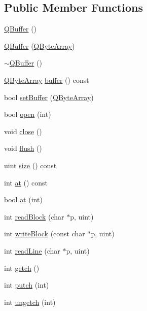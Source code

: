 \subsection*{Public Member Functions}
\begin{DoxyCompactItemize}
\item 
\mbox{\hyperlink{class_q_buffer_a89e6eb0af3076429fcaf14755f856d9a}{Q\+Buffer}} ()
\item 
\mbox{\hyperlink{class_q_buffer_ac88f81ed56581532b835e83812a8650a}{Q\+Buffer}} (\mbox{\hyperlink{class_q_array}{Q\+Byte\+Array}})
\item 
\mbox{\hyperlink{class_q_buffer_a23e9bc1bae06f2c96e456d6b5ca1b52d}{$\sim$\+Q\+Buffer}} ()
\item 
\mbox{\hyperlink{class_q_array}{Q\+Byte\+Array}} \mbox{\hyperlink{class_q_buffer_a4f369e95bc73a6141f1616824ea79470}{buffer}} () const
\item 
bool \mbox{\hyperlink{class_q_buffer_ad4c608788c2730ca60295488f75da423}{set\+Buffer}} (\mbox{\hyperlink{class_q_array}{Q\+Byte\+Array}})
\item 
bool \mbox{\hyperlink{class_q_buffer_aa3ceff2217a13a570e0dcec157b23b18}{open}} (int)
\item 
void \mbox{\hyperlink{class_q_buffer_affd0b382476516b0d4e3adfaf27c0247}{close}} ()
\item 
void \mbox{\hyperlink{class_q_buffer_a5e16941f9973d0263ea1ef79b54bc88f}{flush}} ()
\item 
uint \mbox{\hyperlink{class_q_buffer_aa064f4e430cdd1babd400982881012a8}{size}} () const
\item 
int \mbox{\hyperlink{class_q_buffer_adbff1cb0375ac6bc27621d26450c6c0a}{at}} () const
\item 
bool \mbox{\hyperlink{class_q_buffer_a4b4cd4e092b55db973fa34f76403b65d}{at}} (int)
\item 
int \mbox{\hyperlink{class_q_buffer_a7deacf4bbd599f075f3dad4b20cafeb0}{read\+Block}} (char $\ast$p, uint)
\item 
int \mbox{\hyperlink{class_q_buffer_ad8bdac07e525a782d0759d3082bb296a}{write\+Block}} (const char $\ast$p, uint)
\item 
int \mbox{\hyperlink{class_q_buffer_adcbf115b0d36683e6da2d3baa367382d}{read\+Line}} (char $\ast$p, uint)
\item 
int \mbox{\hyperlink{class_q_buffer_abec634737e1d5a9b314e822737e51992}{getch}} ()
\item 
int \mbox{\hyperlink{class_q_buffer_aa05ca49f73284ac1fa2b01ffb3be2874}{putch}} (int)
\item 
int \mbox{\hyperlink{class_q_buffer_a52f9ebc674d0651e6fd89e148529bb50}{ungetch}} (int)
\end{DoxyCompactItemize}
